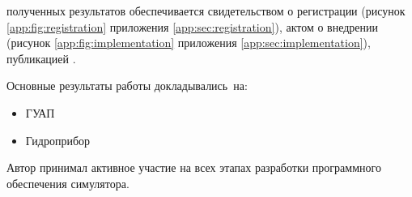 {\reliability} полученных результатов обеспечивается
  свидетельством о регистрации (рисунок \ref{app:fig:registration} приложения \ref{app:sec:registration}),
  актом о внедрении (рисунок \ref{app:fig:implementation} приложения \ref{app:sec:implementation}),  
  публикацией \cite{bib:my:ttd_with_patterns_2019}.


\todo{{\probation}}
Основные результаты работы докладывались~на:
\begin{itemize}
  \item ГУАП
  \item Гидроприбор
\end{itemize}

{\contribution} Автор принимал активное участие на всех этапах разработки программного обеспечения симулятора.
